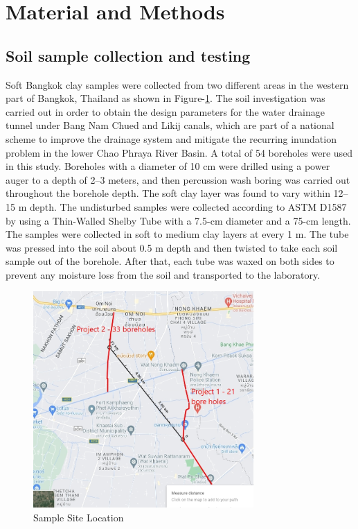 \documentclass[12pt,a4paper]{article}
\begin{document}
	\section{Material and Methods}
	
	\subsection{Soil sample collection and testing}
	
	Soft Bangkok clay samples were collected from two different areas in the western part of Bangkok, Thailand as shown in Figure-\ref{Sample Site Location}. The soil investigation was carried out in order to obtain the design parameters for the water drainage tunnel under Bang Nam Chued and Likij canals, which are part of a national scheme to improve the drainage system and mitigate the recurring inundation problem in the lower Chao Phraya River Basin. A total of 54 boreholes were used in this study. Boreholes with a diameter of 10 cm were drilled using a power auger to a depth of 2–3 meters, and then percussion wash boring was carried out throughout the borehole depth. The soft clay layer was found to vary within 12–15 m depth. The undisturbed samples were collected according to ASTM D1587 by using a Thin-Walled Shelby Tube with a 7.5-cm diameter and a 75-cm length. The samples were collected in soft to medium clay layers at every 1 m. The tube was pressed into the soil about 0.5 m depth and then twisted to take each soil sample out of the borehole. After that, each tube was waxed on both sides to prevent any moisture loss from the soil and transported to the laboratory.
	
	\begin{figure}[H]
		\centering
		\includegraphics[width=0.75\textwidth]{site location.jpg}
		\caption{Sample Site Location}
		\label{Sample Site Location}
	\end{figure}
	
\end{document}

